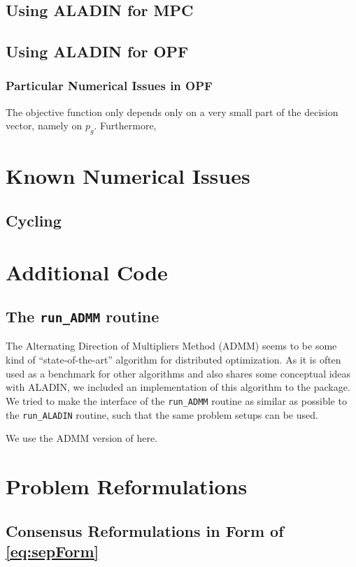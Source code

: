 \documentclass[]{scrartcl}
\begin{document}
\subsection{Using ALADIN for MPC}
\subsection{Using ALADIN for OPF}
\subsubsection{Particular Numerical Issues in OPF}
The objective function only depends only on a very small part of the decision vector, namely on $p_g$.
Furthermore, 


\section{Known Numerical Issues}
\subsection{Cycling} \label{sec:cycling}


\appendix

\section{Additional Code}
\subsection{The \texttt{run\_ADMM} routine}
The Alternating Direction of Multipliers Method (ADMM) seems to be some kind of ``state-of-the-art'' algorithm for distributed optimization.
As it is often used as a benchmark for other algorithms and also shares some conceptual ideas with ALADIN, we included an implementation of this algorithm to the package.
We tried to make the interface of the \texttt{run\_ADMM} routine as similar as possible to the \texttt{run\_ALADIN} routine, such that the same problem setups can be used. 

We use the ADMM version of \cite{Houska} here. 






\section{Problem Reformulations}
\subsection{Consensus Reformulations in Form of \eqref{eq:sepForm}}
\end{document}
